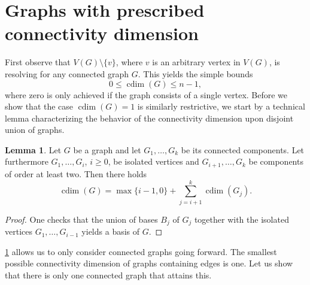 \documentclass[letterpaper,12pt,headings=normal,parskip=half]{scrartcl}
\DeclareMathOperator{\cdim}{cdim}
\theoremstyle{definition}
\newtheorem{lemma}[theorem]{Lemma}
\begin{document}
\section{Graphs with prescribed connectivity dimension}\label{sec:prescribed}

First observe that $V(G)\setminus \{v\}$, where $v$ is an arbitrary vertex in $V(G)$, is resolving for any connected graph $G$. 
This yields the simple bounds
\begin{equation*}
    0\leq \cdim(G)\leq n-1,
\end{equation*}
where zero is only achieved if the graph consists of a single vertex. 
Before we show that the case $\cdim(G)=1$ is similarly restrictive,  we start by a technical lemma characterizing the behavior of the connectivity dimension upon disjoint union of graphs.

\begin{lemma}\label{lem:disjointunion}
    Let $G$ be a graph and let $G_1,\ldots,G_k$ be its connected components. 
    Let furthermore $G_1,\ldots,G_i$, $i\geq0$, be isolated vertices and $G_{i+1},\ldots,G_k$ be components of order at least two.
    Then there holds
    \begin{equation*}
        \cdim(G)=\max\{i-1,0\}+\sum_{j=i+1}^k\cdim(G_j).
    \end{equation*}
\end{lemma}

\begin{proof}
    One checks that the union of bases $B_j$ of $G_j$ together with the isolated vertices $G_1,\ldots,G_{i-1}$ yields a basis of $G$.
\end{proof}

\cref{lem:disjointunion} allows us to only consider connected graphs going forward.
The smallest possible connectivity dimension of graphs containing edges is one.
Let us show that there is only one connected graph that attains this.
\end{document}
